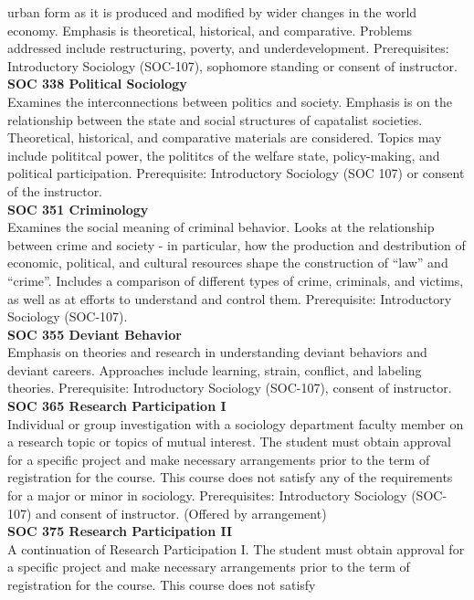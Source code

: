 \documentclass[
  letterpaper,
]{scrbook}
\begin{document}
urban form as it is produced and modified by wider changes in the world
economy. Emphasis is theoretical, historical, and comparative. Problems
addressed include restructuring, poverty, and underdevelopment.
Prerequisites: Introductory Sociology (SOC-107), sophomore standing or
consent of instructor.\\
\textbf{SOC 338 Political Sociology}\\
Examines the interconnections between politics and society. Emphasis is
on the relationship between the state and social structures of
capatalist societies. Theoretical, historical, and comparative materials
are considered. Topics may include polititcal power, the polititcs of
the welfare state, policy-making, and political participation.
Prerequisite: Introductory Sociology (SOC 107) or consent of the
instructor.\\
\textbf{SOC 351 Criminology}\\
Examines the social meaning of criminal behavior. Looks at the
relationship between crime and society - in particular, how the
production and destribution of economic, political, and cultural
resources shape the construction of ``law'' and ``crime''. Includes a
comparison of different types of crime, criminals, and victims, as well
as at efforts to understand and control them. Prerequisite: Introductory
Sociology (SOC-107).\\
\textbf{SOC 355 Deviant Behavior}\\
Emphasis on theories and research in understanding deviant behaviors and
deviant careers. Approaches include learning, strain, conflict, and
labeling theories. Prerequisite: Introductory Sociology (SOC-107),
consent of instructor.\\
\textbf{SOC 365 Research Participation I}\\
Individual or group investigation with a sociology department faculty
member on a research topic or topics of mutual interest. The student
must obtain approval for a specific project and make necessary
arrangements prior to the term of registration for the course. This
course does not satisfy any of the requirements for a major or minor in
sociology. Prerequisites: Introductory Sociology (SOC-107) and consent
of instructor. (Offered by arrangement)\\
\textbf{SOC 375 Research Participation II}\\
A continuation of Research Participation I. The student must obtain
approval for a specific project and make necessary arrangements prior to
the term of registration for the course. This course does not satisfy
\end{document}
